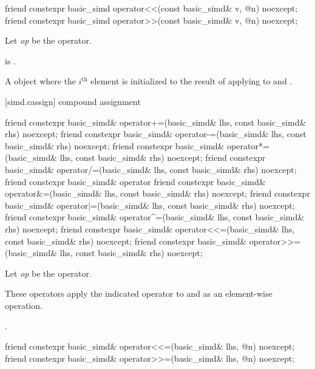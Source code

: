 \begin{itemdecl}
friend constexpr basic_simd operator<<(const basic_simd& v, @\simdsizetype@ n) noexcept;
friend constexpr basic_simd operator>>(const basic_simd& v, @\simdsizetype@ n) noexcept;
\end{itemdecl}

\begin{itemdescr}
  \pnum Let \textit{op} be the operator.

  \pnum\constraints
   is .

  \pnum\returns
  A  object where the $i^\text{th}$ element is initialized to the result of applying \op{} to  and  \foralli.
\end{itemdescr}

[simd.cassign]{ compound assignment}

\begin{itemdecl}
friend constexpr basic_simd& operator+=(basic_simd& lhs, const basic_simd& rhs) noexcept;
friend constexpr basic_simd& operator-=(basic_simd& lhs, const basic_simd& rhs) noexcept;
friend constexpr basic_simd& operator*=(basic_simd& lhs, const basic_simd& rhs) noexcept;
friend constexpr basic_simd& operator/=(basic_simd& lhs, const basic_simd& rhs) noexcept;
friend constexpr basic_simd& operator%
friend constexpr basic_simd& operator&=(basic_simd& lhs, const basic_simd& rhs) noexcept;
friend constexpr basic_simd& operator|=(basic_simd& lhs, const basic_simd& rhs) noexcept;
friend constexpr basic_simd& operator^=(basic_simd& lhs, const basic_simd& rhs) noexcept;
friend constexpr basic_simd& operator<<=(basic_simd& lhs, const basic_simd& rhs) noexcept;
friend constexpr basic_simd& operator>>=(basic_simd& lhs, const basic_simd& rhs) noexcept;
\end{itemdecl}

\begin{itemdescr}
  \pnum Let \textit{op} be the operator.

  \pnum\ConstraintOperatorTWellFormed

  \pnum\effects
  These operators apply the indicated operator to  and  as an element-wise operation.

  \pnum\returns
  .
\end{itemdescr}

\begin{itemdecl}
friend constexpr basic_simd& operator<<=(basic_simd& lhs, @\simdsizetype@ n) noexcept;
friend constexpr basic_simd& operator>>=(basic_simd& lhs, @\simdsizetype@ n) noexcept;
\end{itemdecl}

